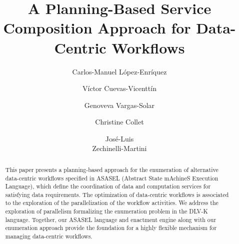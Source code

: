 \documentclass{llncs}
\begin{document}

\title{A Planning-Based Service Composition Approach for Data-Centric Workflows}
%
%
\author{
Carlos-Manuel L\'opez-Enr\'iquez \and V\'ictor Cuevas-Vicentt\'in \and Genoveva Vargas-Solar
\and Christine Collet \and Jos\'e-Luis \\Zechinelli-Martini
}
%
%
%


\maketitle              %

\begin{abstract}

This paper presents a planning-based approach for the enumeration of alternative data-centric workflows specified in ASASEL (Abstract State mAchineS Execution Language), which define the coordination of data and computation services for satisfying data requirements.
The optimization of data-centric workflows is associated to the exploration of the parallelization of the workflow activities.
We address the exploration of parallelism formalizing the enumeration problem in the DLV-K language. 
Together, our ASASEL language and enactment engine along with our enumeration approach provide the foundation for a highly flexible mechanism for managing data-centric workflows.

\end{abstract}
%
\end{document}
